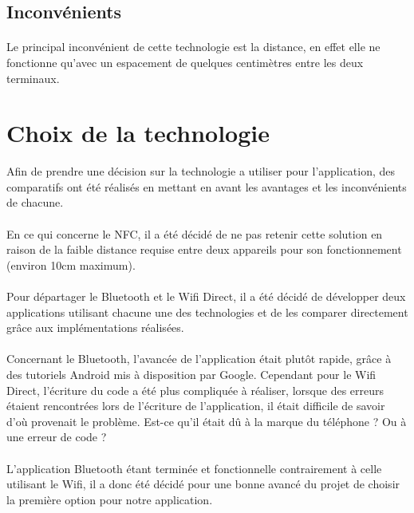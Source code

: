\documentclass[a4paper,10pt]{report}
\begin{document}
    \subsection{Inconvénients}
    \paragraph{}
    Le principal inconvénient de cette technologie est la distance, en effet elle ne fonctionne qu'avec un espacement de quelques centimètres entre les deux terminaux.
  \section{Choix de la technologie}
  
  Afin de prendre une décision sur la technologie a utiliser pour l'application, des comparatifs ont été réalisés en mettant en avant les avantages et les inconvénients de chacune. 
  \paragraph{}
  En ce qui concerne le NFC, il a été décidé de ne pas retenir cette solution en raison de la faible distance requise entre deux appareils pour son fonctionnement (environ 10cm maximum).
  \paragraph{}
  Pour départager le Bluetooth et le Wifi Direct, il a été décidé de développer deux applications utilisant chacune une des technologies et de les comparer directement grâce aux implémentations réalisées.
  \paragraph{}
  Concernant le Bluetooth, l'avancée de l'application était plutôt rapide, grâce à des tutoriels Android mis à disposition par Google. Cependant pour le Wifi Direct, l'écriture du code a été plus compliquée à réaliser, lorsque des erreurs étaient rencontrées lors de l'écriture de l'application, il était difficile de savoir d'où provenait le problème. Est-ce qu'il était dû à la marque du téléphone ? Ou à une erreur de code ? 
  \paragraph{} 
  L'application Bluetooth étant terminée et fonctionnelle contrairement à celle utilisant le Wifi, il a donc été décidé pour une bonne avancé du projet de choisir la première option pour notre application.
  
\end{document}
